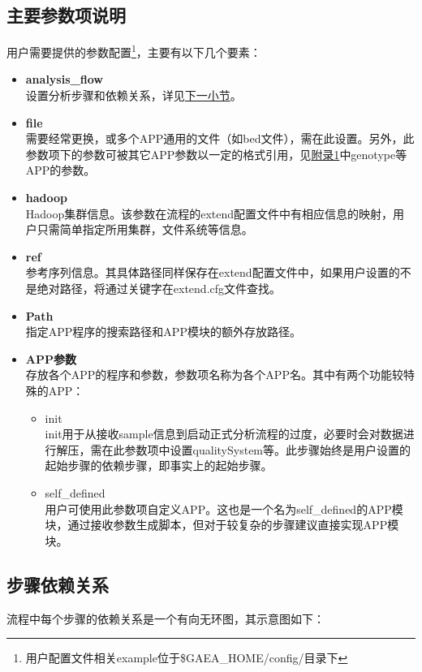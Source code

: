 \documentclass[UTF8,10pt,a4paper]{ctexart}
\begin{document}
\subsection{主要参数项说明}
用户需要提供的参数配置\footnote{用户配置文件相关example位于\$GAEA\_HOME/config/目录下}，主要有以下几个要素：
\begin{itemize}
\item \textbf{analysis\_flow}\\
设置分析步骤和依赖关系，详见{\kaishu \hyperref[subs5.3]{下一小节}}。
\item \textbf{file}\\
需要经常更换，或多个APP通用的文件（如bed文件），需在此设置。另外，此参数项下的参数可被其它APP参数以一定的格式引用，见{\kaishu \hyperref[B]{附录1}}中genotype等APP的参数。
\item \textbf{hadoop}\\
Hadoop集群信息。该参数在流程的extend配置文件中有相应信息的映射，用户只需简单指定所用集群，文件系统等信息。
\item \textbf{ref}\\
参考序列信息。其具体路径同样保存在extend配置文件中，如果用户设置的不是绝对路径，将通过关键字在extend.cfg文件查找。
\item \textbf{Path}\\
指定APP程序的搜索路径和APP模块的额外存放路径。
\item \textbf{APP参数}\\
存放各个APP的程序和参数，参数项名称为各个APP名。其中有两个功能较特殊的APP：
\begin{itemize}
\item  init \\
init用于从接收sample信息到启动正式分析流程的过度，必要时会对数据进行解压，需在此参数项中设置qualitySystem等。此步骤始终是用户设置的起始步骤的依赖步骤，即事实上的起始步骤。
\item  self\_defined \\
用户可使用此参数项自定义APP。这也是一个名为self\_defined的APP模块，通过接收参数生成脚本，但对于较复杂的步骤建议直接实现APP模块。
\end{itemize}

\end{itemize}


\subsection{步骤依赖关系}
\label{subs5.3}
流程中每个步骤的依赖关系是一个有向无环图，其示意图如下：%
\end{document}
